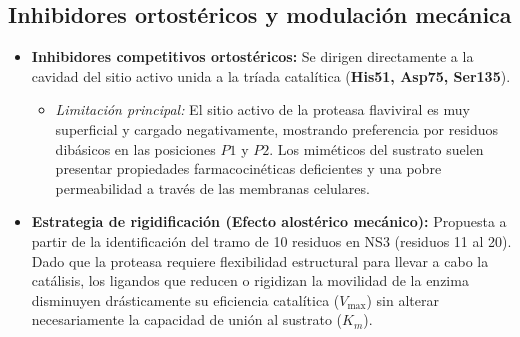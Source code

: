 \subsection{Inhibidores ortostéricos y modulación mecánica}

\begin{itemize}
    \item \textbf{Inhibidores competitivos ortostéricos:} Se dirigen directamente a la cavidad del sitio activo unida a la tríada catalítica (\textbf{His51, Asp75, Ser135}).
    \begin{itemize}
        \item \textit{Limitación principal:} El sitio activo de la proteasa flaviviral es muy superficial y cargado negativamente, mostrando preferencia por residuos dibásicos en las posiciones $P1$ y $P2$. Los miméticos del sustrato suelen presentar propiedades farmacocinéticas deficientes y una pobre permeabilidad a través de las membranas celulares.
    \end{itemize}
    \item \textbf{Estrategia de rigidificación (Efecto alostérico mecánico):} Propuesta a partir de la identificación del tramo de 10 residuos en NS3 (residuos 11 al 20). Dado que la proteasa requiere flexibilidad estructural para llevar a cabo la catálisis, los ligandos que reducen o rigidizan la movilidad de la enzima disminuyen drásticamente su eficiencia catalítica ($V_{\max}$) sin alterar necesariamente la capacidad de unión al sustrato ($K_m$)\cite{chandramouli2010serotype}.
\end{itemize} \newpage

